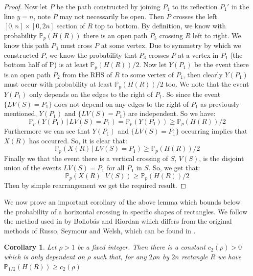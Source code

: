 \documentclass[a4paper,11pt]{article}
\newtheorem{corollary}[theorem]{Corollary}
\theoremstyle{definition}
\newcommand{\prob}{\mathbb{P}_p}
\begin{document}
\begin{proof}
	Now let $P$ be the path constructed by joining $P_1$ to its reflection $P_1'$ in the line $y=n$, note $P$ may not necessarily be open. Then $P$ crosses the left $[0,n] \times [0,2n]$ section of $R$ top to bottom. By definition, we know with probability $\prob(H(R))$ there is an open path $P_3$ crossing $R$ left to right. We know this path $P_3$ must cross $P$ at some vertex. Due to symmetry by which we constructed $P$, we know the probability that $P_3$ crosses $P$ at a vertex in $P_1$ (the bottom half of P) is at least $\prob(H(R))/2$. Now let $Y(P_1)$ be the event there is an open path $P_2$ from the RHS of $R$ to some vertex of $P_1$, then clearly $Y(P_1)$ must occur with probability at least $\prob(H(R))/2$ too. We note that the event $Y(P_1)$ only depends on the edges to the right of $P_1$. So since the event $\{LV(S) = P_1\}$ does not depend on any edges to the right of $P_1$ as previously mentioned, $Y(P_1)$ and $\{LV(S) = P_1\}$ are independent. So we have:
	$$\prob(Y(P_1) \, | \, LV(S) = P_1) = \prob(Y(P_1)) \geq \prob(H(R))/2 $$
	Furthermore we can see that $Y(P_1)$ and $\{LV(S) = P_1\}$ occurring implies that $X(R)$ has occurred. So, it is clear that:
	$$\prob(X(R) \, | \, LV(S) = P_1) \geq \prob(H(R))/2 $$
	Finally we that the event there is a vertical crossing of $S$, $V(S)$, is the disjoint union of the events ${LV(S) = P_1}$ for all $P_1$ in $S$. So, we get that:
	$$\prob(X(R) \, | \, V(S)) \geq \prob(H(R))/2 $$
	Then by simple rearrangement we get the required result.

\end{proof}

We now prove an important corollary of the above lemma which bounds below the probability of a horizontal crossing in specific shapes of rectangles. We follow the method used in \cite{bollobas2006short} by Bollob\'as and Riordan which differs from the original methods of Russo, Seymour and Welsh, which can be found in \cite{grimmett1999percolation}.

\begin{corollary}\label{rectangleBound}
	Let $\rho >1$ be a fixed integer. Then there is a constant $c_2(\rho) > 0$ which is only dependent on $\rho$ such that, for any $2\rho n$ by $2n$ rectangle $R$ we have $\mathbb{P}_{1/2}(H(R)) \geq c_2(\rho)$
\end{corollary}
\end{document}
